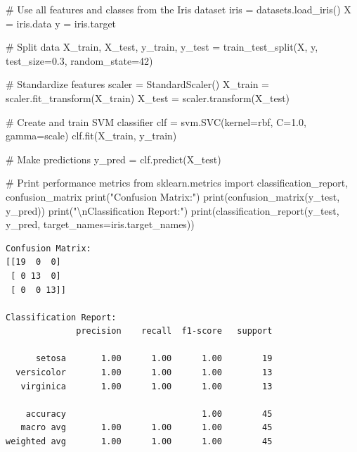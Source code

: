 \documentclass[
  letterpaper,
  DIV=11,
  numbers=noendperiod]{scrreprt}
\newenvironment{Shaded}{\begin{snugshade}}{\end{snugshade}}
\newcommand{\BuiltInTok}[1]{\textcolor[rgb]{0.00,0.23,0.31}{#1}}
\newcommand{\CharTok}[1]{\textcolor[rgb]{0.13,0.47,0.30}{#1}}
\newcommand{\CommentTok}[1]{\textcolor[rgb]{0.37,0.37,0.37}{#1}}
\newcommand{\DecValTok}[1]{\textcolor[rgb]{0.68,0.00,0.00}{#1}}
\newcommand{\FloatTok}[1]{\textcolor[rgb]{0.68,0.00,0.00}{#1}}
\newcommand{\ImportTok}[1]{\textcolor[rgb]{0.00,0.46,0.62}{#1}}
\newcommand{\NormalTok}[1]{\textcolor[rgb]{0.00,0.23,0.31}{#1}}
\newcommand{\OperatorTok}[1]{\textcolor[rgb]{0.37,0.37,0.37}{#1}}
\newcommand{\StringTok}[1]{\textcolor[rgb]{0.13,0.47,0.30}{#1}}
\begin{document}
\begin{Shaded}
\begin{Highlighting}[]
\CommentTok{\# Use all features and classes from the Iris dataset}
\NormalTok{iris }\OperatorTok{=}\NormalTok{ datasets.load\_iris()}
\NormalTok{X }\OperatorTok{=}\NormalTok{ iris.data}
\NormalTok{y }\OperatorTok{=}\NormalTok{ iris.target}

\CommentTok{\# Split data}
\NormalTok{X\_train, X\_test, y\_train, y\_test }\OperatorTok{=}\NormalTok{ train\_test\_split(X, y, test\_size}\OperatorTok{=}\FloatTok{0.3}\NormalTok{, random\_state}\OperatorTok{=}\DecValTok{42}\NormalTok{)}

\CommentTok{\# Standardize features}
\NormalTok{scaler }\OperatorTok{=}\NormalTok{ StandardScaler()}
\NormalTok{X\_train }\OperatorTok{=}\NormalTok{ scaler.fit\_transform(X\_train)}
\NormalTok{X\_test }\OperatorTok{=}\NormalTok{ scaler.transform(X\_test)}

\CommentTok{\# Create and train SVM classifier}
\NormalTok{clf }\OperatorTok{=}\NormalTok{ svm.SVC(kernel}\OperatorTok{=}\StringTok{\textquotesingle{}rbf\textquotesingle{}}\NormalTok{, C}\OperatorTok{=}\FloatTok{1.0}\NormalTok{, gamma}\OperatorTok{=}\StringTok{\textquotesingle{}scale\textquotesingle{}}\NormalTok{)}
\NormalTok{clf.fit(X\_train, y\_train)}

\CommentTok{\# Make predictions}
\NormalTok{y\_pred }\OperatorTok{=}\NormalTok{ clf.predict(X\_test)}

\CommentTok{\# Print performance metrics}
\ImportTok{from}\NormalTok{ sklearn.metrics }\ImportTok{import}\NormalTok{ classification\_report, confusion\_matrix}
\BuiltInTok{print}\NormalTok{(}\StringTok{"Confusion Matrix:"}\NormalTok{)}
\BuiltInTok{print}\NormalTok{(confusion\_matrix(y\_test, y\_pred))}
\BuiltInTok{print}\NormalTok{(}\StringTok{"}\CharTok{\textbackslash{}n}\StringTok{Classification Report:"}\NormalTok{)}
\BuiltInTok{print}\NormalTok{(classification\_report(y\_test, y\_pred, target\_names}\OperatorTok{=}\NormalTok{iris.target\_names))}
\end{Highlighting}
\end{Shaded}

\begin{verbatim}
Confusion Matrix:
[[19  0  0]
 [ 0 13  0]
 [ 0  0 13]]

Classification Report:
              precision    recall  f1-score   support

      setosa       1.00      1.00      1.00        19
  versicolor       1.00      1.00      1.00        13
   virginica       1.00      1.00      1.00        13

    accuracy                           1.00        45
   macro avg       1.00      1.00      1.00        45
weighted avg       1.00      1.00      1.00        45
\end{verbatim}
\end{document}
